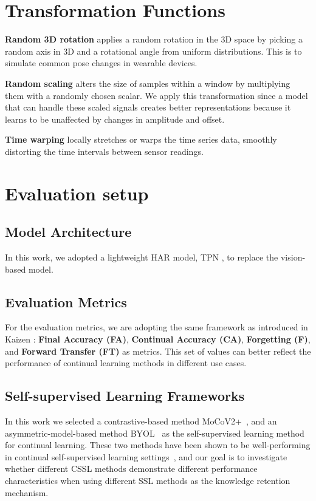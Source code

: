 \begin{appendix}
    
\section{Transformation Functions}
\label{appx:trans}

\noindent\textbf{Random 3D rotation} applies a random rotation in the 3D space by picking a random axis in 3D and a rotational angle from uniform distributions. This is to simulate common pose changes in wearable devices.

\noindent\textbf{Random scaling} alters the size of samples within a window by multiplying them with a randomly chosen scalar. We apply this transformation since a model that can handle these scaled signals creates better representations because it learns to be unaffected by changes in amplitude and offset.

\noindent\textbf{Time warping} locally stretches or warps the time series data, smoothly distorting the time intervals between sensor readings.
\section{Evaluation setup}
\label{appx:setup}
{
\subsection{Model Architecture}
In this work, we adopted a lightweight HAR model, TPN \cite{multi_self_har}, to replace the vision-based model.

\subsection{Evaluation Metrics}
For the evaluation metrics, we are adopting the same framework as introduced in Kaizen \cite{tang2023practical}: \textbf{Final Accuracy (FA)}, \textbf{Continual Accuracy (CA)}, \textbf{Forgetting (F)}, and \textbf{Forward Transfer (FT)} as metrics. This set of values can better reflect the performance of continual learning methods in different use cases.

\subsection{Self-supervised Learning Frameworks}
In this work we selected a contrastive-based method MoCoV2+~\cite{chen2020improved, he2020momentum}, and an asymmetric-model-based method
BYOL~\cite{grill2020bootstrap} as the self-supervised learning method for continual learning. These two methods have been shown to be well-performing in continual self-supervised learning settings~\cite{fini2022self, tang2023practical}, and our goal is to investigate whether different CSSL methods demonstrate different performance characteristics when using different SSL methods as the knowledge retention mechanism.

}
\end{appendix}
